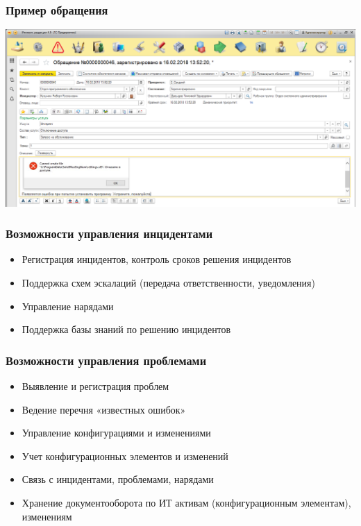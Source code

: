 \documentclass{../industrial-development}
\begin{document}
\begin{frame} \frametitle{Пример обращения}
\centerline{\includegraphics[width=\textwidth]{pic12.png}}
\end{frame}
\lecturenotes

\begin{frame} \frametitle{Возможности управления инцидентами}
	\begin{itemize}
    \item Регистрация инцидентов, контроль сроков решения инцидентов
    \item Поддержка схем эскалаций (передача ответственности, уведомления)
    \item Управление нарядами
    \item Поддержка базы знаний по решению инцидентов
	\end{itemize}
\end{frame}
\lecturenotes

\begin{frame} \frametitle{Возможности управления проблемами}
	\begin{itemize}
    \item Выявление и регистрация проблем
    \item Ведение перечня «известных ошибок»
    \item Управление конфигурациями и изменениями
    \item Учет конфигурационных элементов и изменений
    \item Связь с инцидентами, проблемами, нарядами
    \item Хранение документооборота по ИТ активам (конфигурационным элементам), изменениям
	\end{itemize}
\end{frame}
\lecturenotes
\end{document}
